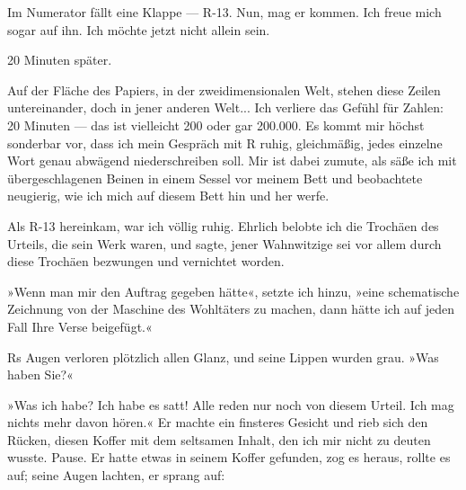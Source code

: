 Im Numerator fällt eine Klappe — R-13. Nun, mag er kommen. Ich
freue mich sogar auf ihn. Ich möchte jetzt nicht allein sein.

20 Minuten später.

Auf der Fläche des Papiers, in der zweidimensionalen Welt, stehen
diese Zeilen untereinander, doch in jener anderen Welt... Ich
verliere das Gefühl für Zahlen: 20 Minuten — das ist vielleicht 200
oder gar 200.000. Es kommt mir höchst sonderbar vor, dass ich mein
Gespräch mit R ruhig, gleichmäßig, jedes einzelne Wort genau
abwägend niederschreiben soll. Mir ist dabei zumute, als säße ich
mit übergeschlagenen Beinen in einem Sessel vor meinem Bett und
beobachtete neugierig, wie ich mich auf diesem Bett hin und her
werfe.

Als R-13 hereinkam, war ich völlig ruhig. Ehrlich belobte ich die
Trochäen des Urteils, die sein Werk waren, und sagte, jener
Wahnwitzige sei vor allem durch diese Trochäen bezwungen und
vernichtet worden.

»Wenn man mir den Auftrag gegeben hätte«, setzte ich hinzu, »eine
schematische Zeichnung von der Maschine des Wohltäters zu machen,
dann hätte ich auf jeden Fall Ihre Verse beigefügt.«

Rs Augen verloren plötzlich allen Glanz, und seine Lippen wurden
grau. »Was haben Sie?«

»Was ich habe? Ich habe es satt! Alle reden nur noch von diesem
Urteil. Ich mag nichts mehr davon hören.« Er machte ein finsteres
Gesicht und rieb sich den Rücken, diesen Koffer mit dem seltsamen
Inhalt, den ich mir nicht zu deuten wusste. Pause. Er hatte etwas
in seinem Koffer gefunden, zog es heraus, rollte es auf; seine
Augen lachten, er sprang auf:


